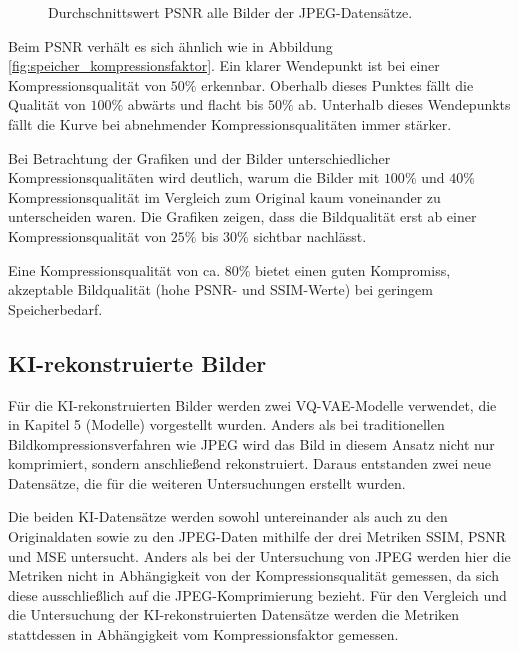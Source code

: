             \begin{figure}[!htb]
                \centering
                
                \caption{Durchschnittswert PSNR alle Bilder der JPEG-Datensätze.}
            \end{figure}

            Beim PSNR verhält es sich ähnlich wie in Abbildung \ref{fig:speicher_kompressionsfaktor}. Ein klarer Wendepunkt ist bei einer Kompressionsqualität von $50\%$ erkennbar. Oberhalb dieses Punktes fällt die Qualität von $100\%$ abwärts und flacht
            bis $50\%$ ab. Unterhalb dieses Wendepunkts fällt die Kurve bei abnehmender Kompressionsqualitäten immer stärker.      
        
            Bei Betrachtung der Grafiken und der Bilder unterschiedlicher Kompressionsqualitäten wird deutlich, warum die Bilder mit $100\%$ und $40\%$ Kompressionsqualität im Vergleich zum Original kaum voneinander zu unterscheiden waren. Die Grafiken zeigen, dass die Bildqualität erst ab einer Kompressionsqualität von $25\%$ bis $30\%$ sichtbar nachlässt.

            Eine Kompressionsqualität von ca. $80\%$ bietet einen guten Kompromiss, akzeptable Bildqualität (hohe PSNR- und SSIM-Werte) bei geringem Speicherbedarf.
            
    
\newpage  
        \subsection{KI-rekonstruierte Bilder}
            Für die KI-rekonstruierten Bilder werden zwei VQ-VAE-Modelle verwendet, die in Kapitel 5 (Modelle) vorgestellt wurden. Anders als bei traditionellen Bildkompressionsverfahren wie JPEG wird das Bild in diesem Ansatz nicht nur komprimiert, sondern anschließend rekonstruiert. Daraus entstanden zwei neue Datensätze, die für die weiteren Untersuchungen erstellt wurden.
            
            Die beiden KI-Datensätze werden sowohl untereinander als auch zu den Originaldaten sowie zu den JPEG-Daten mithilfe der drei Metriken SSIM, PSNR und MSE untersucht.
            Anders als bei der Untersuchung von JPEG werden hier die Metriken nicht in Abhängigkeit von der Kompressionsqualität gemessen, da sich diese ausschließlich auf die JPEG-Komprimierung bezieht.
            Für den Vergleich und die Untersuchung der KI-rekonstruierten Datensätze werden die Metriken stattdessen in Abhängigkeit vom Kompressionsfaktor gemessen.

